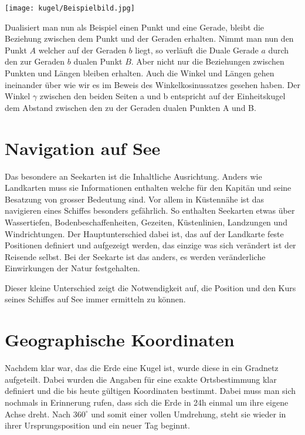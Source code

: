 \begin{refsection}
\begin{center}
        \texttt{[image: kugel/Beispielbild.jpg]}
\end{center}

Dualisiert man nun als Beispiel einen Punkt und eine Gerade, bleibt die Beziehung zwischen dem Punkt und der Geraden erhalten.
Nimmt man nun den Punkt $A$ welcher auf der Geraden $b$ liegt, so verläuft die Duale Gerade $a$ durch den zur Geraden $b$ dualen Punkt $B$. 
Aber nicht nur die Beziehungen zwischen Punkten und Längen bleiben erhalten. Auch die Winkel und Längen gehen ineinander über wie wir es im Beweis des Winkelkosinussatzes gesehen haben.
Der Winkel $\gamma$ zwischen den beiden Seiten a und b entspricht auf der Einheitskugel dem Abstand zwischen den zu der Geraden dualen Punkten A und B.

\section{Navigation auf See}
Das besondere an Seekarten ist die Inhaltliche Ausrichtung. Anders wie Landkarten muss sie Informationen enthalten welche für den Kapitän und seine Besatzung von grosser Bedeutung sind. Vor allem in Küstennähe ist das navigieren eines Schiffes besonders gefährlich. So enthalten Seekarten etwas über Wassertiefen, Bodenbeschaffenheiten, Gezeiten, Küstenlinien, Landzungen und Windrichtungen.
Der Hauptunterschied dabei ist, das auf der Landkarte feste Positionen definiert und aufgezeigt werden, das einzige was sich verändert ist der Reisende selbst. Bei der Seekarte ist das anders, es werden veränderliche Einwirkungen der Natur festgehalten.

Dieser kleine Unterschied zeigt die Notwendigkeit auf, die Position und den Kurs seines Schiffes auf See immer ermitteln zu können.


\section{Geographische Koordinaten}

Nachdem klar war, das die Erde eine Kugel ist, wurde diese in ein Gradnetz aufgeteilt. Dabei wurden die Angaben für eine exakte Ortsbestimmung klar definiert und die bis heute gültigen Koordinaten bestimmt.
Dabei muss man sich nochmals in Erinnerung rufen, dass sich die Erde in 24h einmal um ihre eigene Achse dreht. Nach $360 ^{\circ}$ 
und somit einer vollen Umdrehung, steht sie wieder in ihrer Ursprungsposition und ein neuer Tag beginnt.


\end{refsection}
